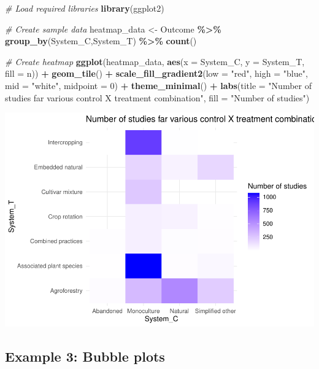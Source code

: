 \documentclass[
]{book}
\newenvironment{Shaded}{\begin{snugshade}}{\end{snugshade}}
\newcommand{\AttributeTok}[1]{\textcolor[rgb]{0.13,0.29,0.53}{#1}}
\newcommand{\CommentTok}[1]{\textcolor[rgb]{0.56,0.35,0.01}{\textit{#1}}}
\newcommand{\DecValTok}[1]{\textcolor[rgb]{0.00,0.00,0.81}{#1}}
\newcommand{\FunctionTok}[1]{\textcolor[rgb]{0.13,0.29,0.53}{\textbf{#1}}}
\newcommand{\NormalTok}[1]{#1}
\newcommand{\OtherTok}[1]{\textcolor[rgb]{0.56,0.35,0.01}{#1}}
\newcommand{\SpecialCharTok}[1]{\textcolor[rgb]{0.81,0.36,0.00}{\textbf{#1}}}
\newcommand{\StringTok}[1]{\textcolor[rgb]{0.31,0.60,0.02}{#1}}
\begin{document}
\begin{Shaded}
\begin{Highlighting}[]
\CommentTok{\# Load required libraries}
\FunctionTok{library}\NormalTok{(ggplot2)}

\CommentTok{\# Create sample data}
\NormalTok{heatmap\_data }\OtherTok{\textless{}{-}}\NormalTok{ Outcome }\SpecialCharTok{\%\textgreater{}\%} 
  \FunctionTok{group\_by}\NormalTok{(System\_C,System\_T) }\SpecialCharTok{\%\textgreater{}\%} 
  \FunctionTok{count}\NormalTok{()}

\CommentTok{\# Create heatmap}
\FunctionTok{ggplot}\NormalTok{(heatmap\_data, }\FunctionTok{aes}\NormalTok{(}\AttributeTok{x =}\NormalTok{ System\_C, }\AttributeTok{y =}\NormalTok{ System\_T, }\AttributeTok{fill =}\NormalTok{ n)) }\SpecialCharTok{+}
  \FunctionTok{geom\_tile}\NormalTok{() }\SpecialCharTok{+}
  \FunctionTok{scale\_fill\_gradient2}\NormalTok{(}\AttributeTok{low =} \StringTok{"red"}\NormalTok{, }\AttributeTok{high =} \StringTok{"blue"}\NormalTok{, }\AttributeTok{mid =} \StringTok{"white"}\NormalTok{, }\AttributeTok{midpoint =} \DecValTok{0}\NormalTok{) }\SpecialCharTok{+}
  \FunctionTok{theme\_minimal}\NormalTok{() }\SpecialCharTok{+}
  \FunctionTok{labs}\NormalTok{(}\AttributeTok{title =} \StringTok{"Number of studies far various control X treatment combination"}\NormalTok{,}
       \AttributeTok{fill =} \StringTok{"Number of studies"}\NormalTok{)}
\end{Highlighting}
\end{Shaded}

\includegraphics{_main_files/figure-latex/unnamed-chunk-11-1.pdf}

\subsection{Example 3: Bubble plots}\label{example-3-bubble-plots}
\end{document}
